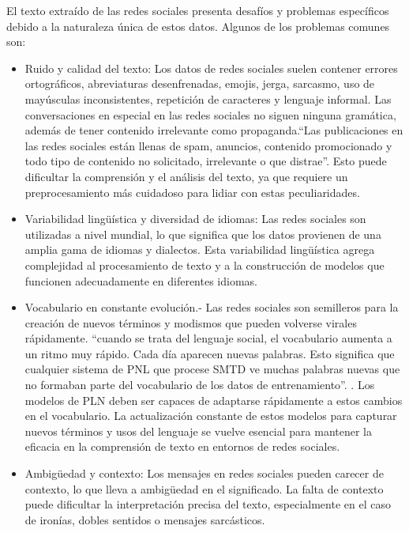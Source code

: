El texto extraído de las redes sociales presenta desafíos y problemas específicos debido a la naturaleza única de estos datos. Algunos de los problemas comunes son:

\begin{itemize}

	\item Ruido y calidad del texto: Los datos de redes sociales suelen contener errores ortográficos, abreviaturas desenfrenadas, emojis, jerga, sarcasmo, uso  de mayúsculas inconsistentes, repetición de caracteres y lenguaje informal. Las conversaciones en especial en las redes sociales no siguen ninguna gramática, además de tener contenido irrelevante como propaganda.``Las publicaciones en las redes sociales están llenas de spam, anuncios, contenido promocionado y todo tipo de contenido no solicitado, irrelevante o que distrae''\cite[p. 283]{vajjala2020practical}. Esto puede dificultar la comprensión y el análisis del texto, ya que requiere un preprocesamiento más cuidadoso para lidiar con estas peculiaridades.
	
	\item Variabilidad lingüística y diversidad de idiomas: Las redes sociales son utilizadas a nivel mundial, lo que significa que los datos provienen de una amplia gama de idiomas y dialectos. Esta variabilidad lingüística agrega complejidad al procesamiento de texto y a la construcción de modelos que funcionen adecuadamente en diferentes idiomas.
	
	\item Vocabulario en constante evolución.- Las redes sociales son semilleros para la creación de nuevos términos y modismos que pueden volverse virales rápidamente. ``cuando se trata del lenguaje social, el vocabulario aumenta a un ritmo muy rápido. Cada día aparecen nuevas palabras. Esto significa que cualquier sistema de PNL que procese SMTD ve muchas palabras nuevas que no formaban parte del vocabulario de los datos de entrenamiento''. \cite[p. 281]{vajjala2020practical}. Los modelos de PLN deben ser capaces de adaptarse rápidamente a estos cambios en el vocabulario. La actualización constante de estos modelos para capturar nuevos términos y usos del lenguaje se vuelve esencial para mantener la eficacia en la comprensión de texto en entornos de redes sociales.
	
	\item Ambigüedad y contexto: Los mensajes en redes sociales pueden carecer de contexto, lo que lleva a ambigüedad en el significado. La falta de contexto puede dificultar la interpretación precisa del texto, especialmente en el caso de ironías, dobles sentidos o mensajes sarcásticos.	
\end{itemize}

